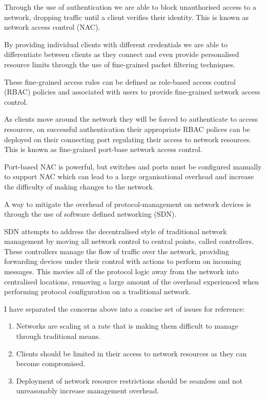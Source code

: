 Through the use of authentication we are able to block unauthorised access to a network, dropping traffic until a client verifies their identity. This is known as network access control (NAC).

By providing individual clients with different credentials we are able to differentiate between clients as they connect and even provide personalised resource limits through the use of fine-grained packet filtering techniques.

These fine-grained access rules can be defined as role-based access control (RBAC) policies and associated with users to provide fine-grained network access control.

As clients move around the network they will be forced to authenticate to access resources, on successful authentication their appropriate RBAC polices can be deployed on their connecting port regulating their access to network resources. This is known as fine-grained port-base network access control.

Port-based NAC is powerful, but switches and ports must be configured manually to support NAC which can lead to a large organisational overhead and increase the difficulty of making changes to the network.\cite{fortinet_nac}

A way to mitigate the overhead of protocol-management on network devices is through the use of software defined networking (SDN). 

SDN attempts to address the decentralised style of traditional network management by moving all network control to central points, called controllers. These controllers manage the flow of traffic over the network, providing forwarding devices under their control with actions to perform on incoming messages. This movies all of the protocol logic away from the network into centralised locations, removing a large amount of the overhead experienced when performing protocol configuration on a traditional network.

I have separated the concerns above into a concise set of issues for reference:
\begin{enumerate}
\item Networks are scaling at a rate that is making them difficult to manage through traditional means.
\item Clients should be limited in their access to network resources as they can become compromised.
\item Deployment of network resource restrictions should be seamless and not unreasonably increase management overhead.
\end{enumerate}

